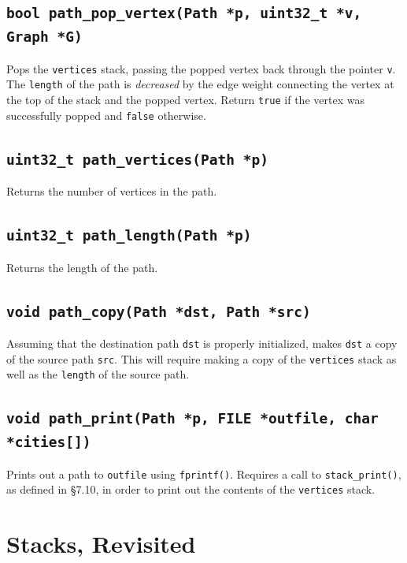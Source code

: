 \documentclass[11pt]{article}
\begin{document}
\subsection{\texttt{bool path\_pop\_vertex(Path *p, uint32\_t *v, Graph
*G)}}

Pops the \texttt{vertices} stack, passing the popped vertex back through
the pointer \texttt{v}. The \texttt{length} of the path is
\emph{decreased} by the edge weight connecting the vertex at the top of
the stack and the popped vertex. Return \texttt{true} if the vertex was
successfully popped and \texttt{false} otherwise.

\subsection{\texttt{uint32\_t path\_vertices(Path *p)}}

Returns the number of vertices in the path.

\subsection{\texttt{uint32\_t path\_length(Path *p)}}

Returns the length of the path.

\subsection{\texttt{void path\_copy(Path *dst, Path *src)}}

Assuming that the destination path \texttt{dst} is properly initialized,
makes \texttt{dst} a copy of the source path \texttt{src}. This will
require making a copy of the \texttt{vertices} stack as well as the
\texttt{length} of the source path.

\subsection{\texttt{void path\_print(Path *p, FILE *outfile, char
*cities[])}}

Prints out a path to \texttt{outfile} using \texttt{fprintf()}. Requires
a call to \texttt{stack\_print()}, as defined in \S 7.10, in order to
print out the contents of the \texttt{vertices} stack.

\section{Stacks, Revisited}
\end{document}
